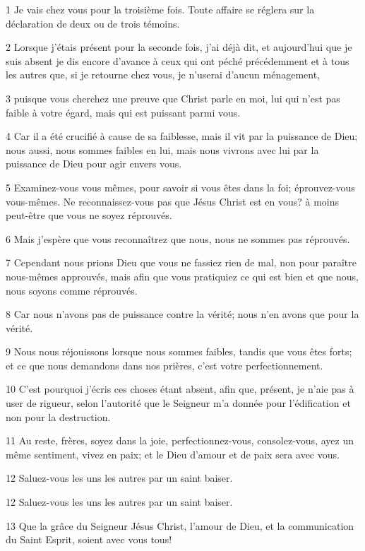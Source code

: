 \par 1 Je vais chez vous pour la troisième fois. Toute affaire se réglera sur la déclaration de deux ou de trois témoins.
\par 2 Lorsque j'étais présent pour la seconde fois, j'ai déjà dit, et aujourd'hui que je suis absent je dis encore d'avance à ceux qui ont péché précédemment et à tous les autres que, si je retourne chez vous, je n'userai d'aucun ménagement,
\par 3 puisque vous cherchez une preuve que Christ parle en moi, lui qui n'est pas faible à votre égard, mais qui est puissant parmi vous.
\par 4 Car il a été crucifié à cause de sa faiblesse, mais il vit par la puissance de Dieu; nous aussi, nous sommes faibles en lui, mais nous vivrons avec lui par la puissance de Dieu pour agir envers vous.
\par 5 Examinez-vous vous mêmes, pour savoir si vous êtes dans la foi; éprouvez-vous vous-mêmes. Ne reconnaissez-vous pas que Jésus Christ est en vous? à moins peut-être que vous ne soyez réprouvés.
\par 6 Mais j'espère que vous reconnaîtrez que nous, nous ne sommes pas réprouvés.
\par 7 Cependant nous prions Dieu que vous ne fassiez rien de mal, non pour paraître nous-mêmes approuvés, mais afin que vous pratiquiez ce qui est bien et que nous, nous soyons comme réprouvés.
\par 8 Car nous n'avons pas de puissance contre la vérité; nous n'en avons que pour la vérité.
\par 9 Nous nous réjouissons lorsque nous sommes faibles, tandis que vous êtes forts; et ce que nous demandons dans nos prières, c'est votre perfectionnement.
\par 10 C'est pourquoi j'écris ces choses étant absent, afin que, présent, je n'aie pas à user de rigueur, selon l'autorité que le Seigneur m'a donnée pour l'édification et non pour la destruction.
\par 11 Au reste, frères, soyez dans la joie, perfectionnez-vous, consolez-vous, ayez un même sentiment, vivez en paix; et le Dieu d'amour et de paix sera avec vous.
\par 12 Saluez-vous les uns les autres par un saint baiser.
\par 12 Saluez-vous les uns les autres par un saint baiser.
\par 13 Que la grâce du Seigneur Jésus Christ, l'amour de Dieu, et la communication du Saint Esprit, soient avec vous tous!


